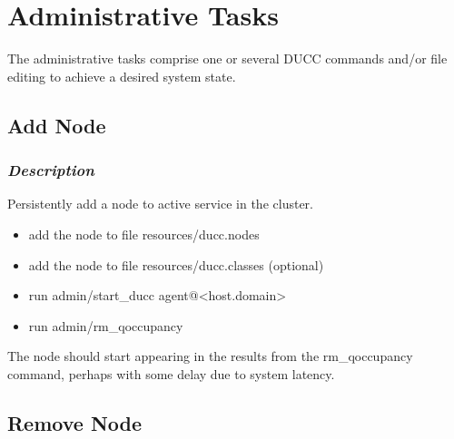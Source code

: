 % 
% 
% 
% 

\section{Administrative Tasks}

   The administrative tasks comprise one or several DUCC commands 
   and/or file editing to achieve a desired system state.

\subsection{Add Node}
\label{subsec:admin.add-node}

	\subsubsection{{\em Description}}
    Persistently add a node to active service in the cluster.
    \begin{itemize}
      \item add the node to file resources/ducc.nodes
      \item add the node to file resources/ducc.classes (optional)
      \item run admin/start\_ducc agent@<host.domain>
      \item run admin/rm\_qoccupancy
    \end{itemize}

	The node should start appearing in the results from the
	rm\_qoccupancy command, perhaps with some delay due to
	system latency.
	
\subsection{Remove Node}
\label{subsec:admin.remove-node}

